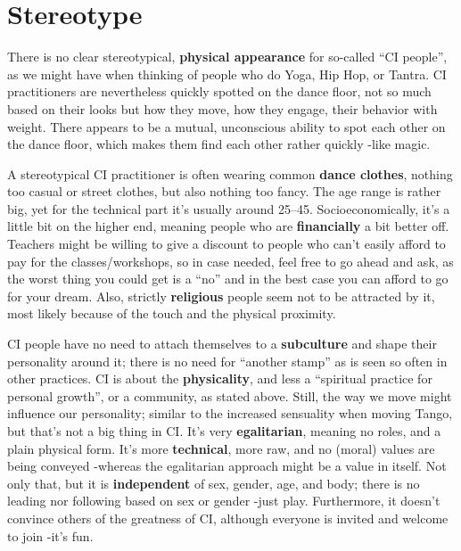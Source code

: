 \section{Stereotype}\label{sec:stereotype}

There is no clear stereotypical, \textbf{physical appearance} for so-called ``CI people'', as we might have when thinking of people who do Yoga, Hip Hop, or Tantra.
CI practitioners are nevertheless quickly spotted on the dance floor, not so much based on their looks but how they move, how they engage, their behavior with weight.
There appears to be a mutual, unconscious ability to spot each other on the dance floor, which makes them find each other rather quickly -like magic.

A stereotypical CI practitioner is often wearing common \textbf{dance clothes}, nothing too casual or street clothes, but also nothing too fancy.
The age range is rather big, yet for the technical part it's usually around 25--45.
Socioeconomically, it's a little bit on the higher end, meaning people who are \textbf{financially} a bit better off.
Teachers might be willing to give a discount to people who can't easily afford to pay for the classes/workshops, so in case needed, feel free to go ahead and ask, as the worst thing you could get is a ``no'' and in the best case you can afford to go for your dream.
Also, strictly \textbf{religious} people seem not to be attracted by it, most likely because of the touch and the physical proximity.

CI people have no need to attach themselves to a \textbf{subculture} and shape their personality around it; there is no need for ``another stamp'' as is seen so often in other practices.
CI is about the \textbf{physicality}, and less a ``spiritual practice for personal growth'', or a community, as stated above.
Still, the way we move might influence our personality; similar to the increased sensuality when moving Tango, but that's not a big thing in CI\@.
It's very \textbf{egalitarian}, meaning no roles, and a plain physical form.
It's more \textbf{technical}, more raw, and no (moral) values are being conveyed -whereas the egalitarian approach might be a value in itself.
Not only that, but it is \textbf{independent} of sex, gender, age, and body; there is no leading nor following based on sex or gender -just play.
Furthermore, it doesn't convince others of the greatness of CI, although everyone is invited and welcome to join -it's fun.

